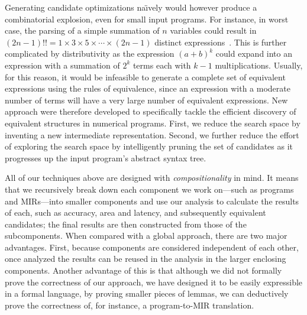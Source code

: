 Generating candidate optimizations na{\"\i}vely would however produce a
combinatorial explosion, even for small input programs.  For instance,
in worst case, the parsing of a simple summation of $n$ variables could
result in $(2n - 1)!! = 1\times3\times5\times\cdots\times(2n - 1)$ distinct
expressions~\cite{ioualalen, mouilleron}.  This is further complicated
by distributivity as the expression ${(a + b)}^k$ could expand into an
expression with a summation of $2^k$ terms each with $k - 1$ multiplications.
Usually, for this reason, it would be infeasible to generate a complete set
of equivalent expressions using the rules of equivalence, since an expression
with a moderate number of terms will have a very large number of equivalent
expressions.  New approach were therefore developed to specifically tackle the
efficient discovery of equivalent structures in numerical programs.  First, we
reduce the search space by inventing a new intermediate representation. Second,
we further reduce the effort of exploring the search space by intelligently
pruning the set of candidates as it progresses up the input program's abstract
syntax tree.

All of our techniques above are designed with \emph{compositionality} in mind.
It means that we recursively break down each component we work on---such as
programs and MIRs---into smaller components and use our analysis to calculate
the results of each, such as accuracy, area and latency, and subsequently
equivalent candidates; the final results are then constructed from those of
the subcomponents.  When compared with a global approach, there are two major
advantages.  First, because components are considered independent of each
other, once analyzed the results can be reused in the analysis in the larger
enclosing components.  Another advantage of this is that although we did not
formally prove the correctness of our approach, we have designed it to be
easily expressible in a formal language, by proving smaller pieces of lemmas,
we can deductively prove the correctness of, for instance, a program-to-MIR
translation.
